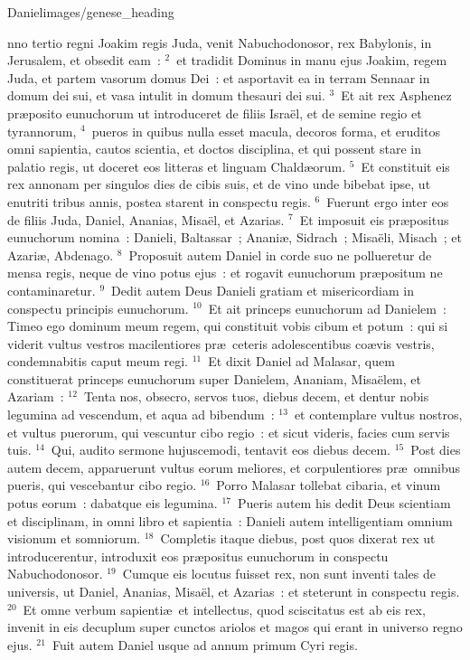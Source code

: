 {Daniel}{images/genese_heading}


\bchapter
{}nno tertio regni Joakim regis Juda, venit Nabuchodonosor, rex Babylonis, in Jerusalem, et obsedit eam~:
${}^{2}$~et tradidit Dominus in manu ejus Joakim, regem Juda, et partem vasorum domus Dei~: et asportavit ea in terram Sennaar in domum dei sui, et vasa intulit in domum thesauri dei sui.
${}^{3}$~Et ait rex Asphenez pr\ae posito eunuchorum ut introduceret de filiis Isra\"el, et de semine regio et tyrannorum,
${}^{4}$~pueros in quibus nulla esset macula, decoros forma, et eruditos omni sapientia, cautos scientia, et doctos disciplina, et qui possent stare in palatio regis, ut doceret eos litteras et linguam Chald\ae orum.
${}^{5}$~Et constituit eis rex annonam per singulos dies de cibis suis, et de vino unde bibebat ipse, ut enutriti tribus annis, postea starent in conspectu regis.
${}^{6}$~Fuerunt ergo inter eos de filiis Juda, Daniel, Ananias, Misa\"el, et Azarias.
${}^{7}$~Et imposuit eis pr\ae positus eunuchorum nomina~: Danieli, Baltassar~; Anani\ae , Sidrach~; Misa\"eli, Misach~; et Azari\ae , Abdenago.
${}^{8}$~Proposuit autem Daniel in corde suo ne pollueretur de mensa regis, neque de vino potus ejus~: et rogavit eunuchorum pr\ae positum ne contaminaretur.
${}^{9}$~Dedit autem Deus Danieli gratiam et misericordiam in conspectu principis eunuchorum.
${}^{10}$~Et ait princeps eunuchorum ad Danielem~: Timeo ego dominum meum regem, qui constituit vobis cibum et potum~: qui si viderit vultus vestros macilentiores pr\ae\ ceteris adolescentibus co\ae vis vestris, condemnabitis caput meum regi.
${}^{11}$~Et dixit Daniel ad Malasar, quem constituerat princeps eunuchorum super Danielem, Ananiam, Misa\"elem, et Azariam~:
${}^{12}$~Tenta nos, obsecro, servos tuos, diebus decem, et dentur nobis legumina ad vescendum, et aqua ad bibendum~:
${}^{13}$~et contemplare vultus nostros, et vultus puerorum, qui vescuntur cibo regio~: et sicut videris, facies cum servis tuis.
${}^{14}$~Qui, audito sermone hujuscemodi, tentavit eos diebus decem.
${}^{15}$~Post dies autem decem, apparuerunt vultus eorum meliores, et corpulentiores pr\ae\ omnibus pueris, qui vescebantur cibo regio.
${}^{16}$~Porro Malasar tollebat cibaria, et vinum potus eorum~: dabatque eis legumina.
${}^{17}$~Pueris autem his dedit Deus scientiam et disciplinam, in omni libro et sapientia~: Danieli autem intelligentiam omnium visionum et somniorum.
${}^{18}$~Completis itaque diebus, post quos dixerat rex ut introducerentur, introduxit eos pr\ae positus eunuchorum in conspectu Nabuchodonosor.
${}^{19}$~Cumque eis locutus fuisset rex, non sunt inventi tales de universis, ut Daniel, Ananias, Misa\"el, et Azarias~: et steterunt in conspectu regis.
${}^{20}$~Et omne verbum sapienti\ae\ et intellectus, quod sciscitatus est ab eis rex, invenit in eis decuplum super cunctos ariolos et magos qui erant in universo regno ejus.
${}^{21}$~Fuit autem Daniel usque ad annum primum Cyri regis.

